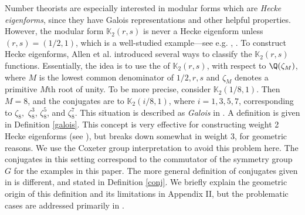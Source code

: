 \documentclass[12pt]{amsart}
\theoremstyle{definition}
\theoremstyle{remark}
\begin{document}
Number theorists are especially interested in modular forms which are \textit{Hecke eigenforms}, since they have Galois representations and other helpful properties. However, the modular form $\mathbb{K}_2(r,s)$ is never a Hecke eigenform unless $(r,s)=(1/2,1)$, which is a well-studied example---see e.g. \cite{ahlgrenono}, \cite{osburnstraub}. To construct Hecke eigenforms, Allen et al. introduced several ways to classify the $\mathbb{K}_2(r,s)$ functions. Essentially, the idea is to use the  of $\mathbb{K}_2(r,s)$, with respect to $\Q(\zeta_M)$, where $M$ is the lowest common denominator of $1/2,r,s$ and $\zeta_M$ denotes a primitive $M$th root of unity. To be more precise, consider $\mathbb{K}_2(1/8,1)$. Then $M=8$, and the conjugates are to $\mathbb{K}_2(i/8,1)$, where $i= 1,3,5,7$, corresponding to $ \zeta_8,$ $\zeta_8^3$, $\zeta_8^5$, and $\zeta_8^7$. This situation is described as \textit{Galois} in \cite{aglt}. A definition is given in Definition \ref{galois}. This concept is very effective for constructing weight 2 Hecke eigenforms (see \cite{rosen}), but breaks down somewhat in weight 3, for geometric reasons.  We use the Coxeter group interpretation to avoid this problem here. The conjugates in this setting correspond to the commutator of the symmetry group $G$ for the examples in this paper. The more general definition of conjugates given in \cite{aglt} is different, and stated in Definition \ref{conj}. We briefly explain the geometric origin of this definition and its limitations in Appendix II, but the problematic cases are addressed primarily in \cite{rosen2}.
\end{document}
